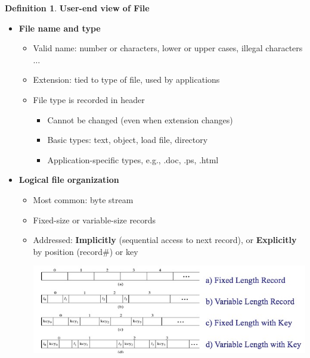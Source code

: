 \documentclass[11pt,a4paper]{article}
\theoremstyle{definition}
\newtheorem{definition}{Definition}[section]
\newenvironment{myitemize}
{ \begin{itemize}
    \setlength{\itemsep}{5pt}
    \setlength{\parskip}{0pt}
    \setlength{\parsep}{0pt}     }
{ \end{itemize}                  }
\begin{document}
\begin{definition}{\textbf{User-end view of File}}
	\begin{myitemize}
		\item \textbf{File name and type}
		\begin{myitemize}
			\item Valid name: number or characters, lower or upper cases, illegal characters $\dots$
			\item Extension: tied to type of file, used by applications
			\item File type is recorded in header
			\begin{myitemize}
				\item Cannot be changed (even when extension changes)
				\item Basic types: text, object, load file, directory
				\item Application-specific types, e.g., .doc, .ps, .html
			\end{myitemize}
		\end{myitemize}
		\item \textbf{Logical file organization}
		\begin{myitemize}
			\item Most common: byte stream
			\item Fixed-size or variable-size records
			\item Addressed: \textbf{Implicitly} (sequential access to next record), or \textbf{Explicitly} by position (record\#) or key
			\begin{center}
				\includegraphics[scale=0.4]{m2/fileOrgType}
			\end{center}
		\end{myitemize}
	\end{myitemize}
\end{definition}
\end{document}
